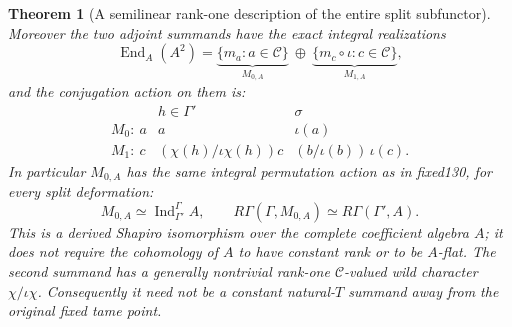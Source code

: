\documentclass[11pt]{article}
\newtheorem{theorem}{Theorem}[section]
\theoremstyle{definition}
\begin{document}
\begin{theorem}[A semilinear rank-one description of the entire split subfunctor]
Moreover the two
adjoint summands
have the exact
integral realizations
\begin{equation}\label{eq:dyadic-f131-skew-endo-split}
\boxed{\quad
\operatorname{End}_A(A^2)
=
\underbrace{\{m_a:a\in\mathcal C\}}_{M_{0,A}}
\ \oplus\
\underbrace{\{m_c\circ\iota:c\in\mathcal C\}}_{M_{1,A}},
\quad}
\end{equation}
and the conjugation
action on them is:
\begin{equation}\label{eq:dyadic-f131-skew-endo-actions}
\boxed{
\begin{array}{c|cc}
& h\in\Gamma'&\sigma\\ \hline
M_0:\ a
 &a&\iota(a)\\
M_1:\ c
 &(\chi(h)/\iota\chi(h))c&
 (b/\iota(b))\,\iota(c).
\end{array}}
\end{equation}
In particular
$M_{0,A}$ has
the \emph{same}
integral permutation
action as in fixed130,
for \emph{every}
split deformation:
\begin{equation}\label{eq:dyadic-f131-family-shapiro-m0}
\boxed{\quad
M_{0,A}
\simeq\operatorname{Ind}_{\Gamma'}^\Gamma A,
\qquad
R\Gamma(\Gamma,M_{0,A})
\simeq R\Gamma(\Gamma',A).
\quad}
\end{equation}
This is a derived
Shapiro isomorphism
over the complete
coefficient algebra $A$;
it does not require
the cohomology of $A$
to have constant
rank or to be
$A$-flat.
The second summand
has a generally
\emph{nontrivial}
rank-one
$\mathcal C$-valued
wild character
$\chi/\iota\chi$.
Consequently it
need not be a
constant natural-$T$
summand away from
the original
fixed tame point.
\end{theorem}
\end{document}
